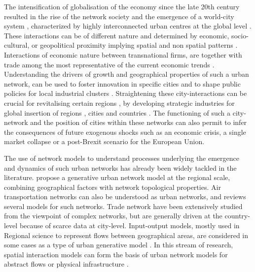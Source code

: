 \documentclass[11pt]{article}
\begin{document}
The intensification of globalisation of the economy since the late 20th century resulted in the rise of the network society \citep{castells2000networksociety} and the emergence of a world-city system \citep{taylor2001specification}, characterized by highly interconnected urban centres at the global level \citep{sassen1991}. These interactions can be of different nature and determined by economic, socio-cultural, or geopolitical proximity implying spatial and non spatial patterns \citep{martinus2018global}. Interactions of economic nature between transnational firms, are together with trade among the most representative of the current economic trends \citep{taylor2001specification}. Understanding the drivers of growth and geographical properties of such a urban network, can be used to foster innovation in specific cities and to shape public policies for local industrial clusters \citep{turkina2016structure}. Straightening these city-interactions can be crucial for revitalising certain regions \cite{Clarke2018}, by developing strategic industries for global insertion of regions \cite{dawley2019creating}, cities \cite{gluckler2016relational} and countries \cite{martinus2019brokerage}. The functioning of such a city-network and the position of cities within these networks \cite{gluckler2016relational} can also permit to infer the consequences of future exogenous shocks such as an economic crisis, a single market collapse or a post-Brexit scenario for the European Union.

The use of network models to understand processes underlying the emergence and dynamics of such urban networks has already been widely tackled in the literature. \cite{dai2016simulating} propose a generative urban network model at the regional scale, combining geographical factors with network topological properties. Air transportation networks can also be understood as urban networks, and \cite{zanin2013modelling} reviews several models for such networks. Trade network have been extensively studied from the viewpoint of complex networks, but are generally driven at the country-level \cite{garlaschelli2005structure} because of scarce data at city-level. Input-output models, mostly used in Regional science to represent flows between geographical areas, are considered in some cases as a type of urban generative model \cite{jin1993generation}. In this stream of research, spatial interaction models \cite{dennett2013multilevel} can form the basis of urban network models for abstract flows \cite{dai2016generative} or physical infrastructure \cite{raimbault2020indirect}.
\end{document}
